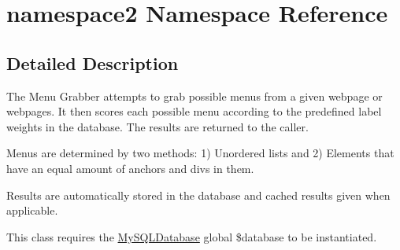 \hypertarget{namespacenamespace2}{\section{namespace2 Namespace Reference}
\label{namespacenamespace2}
}


\subsection{Detailed Description}
The Menu Grabber attempts to grab possible menus from a given webpage or webpages. It then scores each possible menu according to the predefined label weights in the database. The results are returned to the caller.

Menus are determined by two methods\-: 1) Unordered lists and 2) Elements that have an equal amount of anchors and divs in them.

Results are automatically stored in the database and cached results given when applicable.

This class requires the \hyperlink{classMySQLDatabase}{My\-S\-Q\-L\-Database} global \$database to be instantiated. 